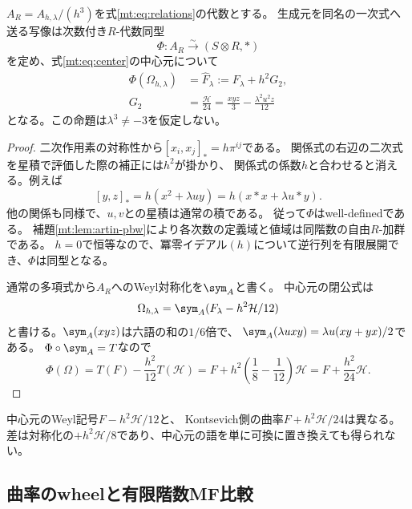 \begin{proposition}[周囲の代数と中心元の二次同定]
\label{kj:prop:algebra-and-center}
$A_R=A_{h,\lambda}/(h^3)$を式\eqref{mt:eq:relations}の代数とする。
生成元を同名の一次式へ送る写像は次数付き$R$-代数同型
\begin{equation}\label{kj:eq:Phi}
 \Phi:A_R\xrightarrow{\sim}(S\otimes R,*)
\end{equation}
を定め、式\eqref{mt:eq:center}の中心元について
\begin{equation}\label{kj:eq:effective}
 \begin{split}
 \Phi(\Omega_{h,\lambda})&=\widehat F_\lambda:=F_\lambda+h^2G_2,\\
 G_2&=\frac{\mathcal H}{24}
     =\frac{xyz}{3}-\frac{\lambda^2u^2z}{12}
 \end{split}
\end{equation}
となる。この命題は$\lambda^3\ne-3$を仮定しない。
\end{proposition}
\begin{proof}
二次作用素の対称性から$[x_i,x_j]_* =h\pi^{ij}$である。
関係式の右辺の二次式を星積で評価した際の補正には$h^2$が掛かり、
関係式の係数$h$と合わせると消える。例えば
\[
 [y,z]_* =h(x^2+\lambda uy)=h(x*x+\lambda u*y).
\]
他の関係も同様で、$u,v$との星積は通常の積である。
従って$\Phi$はwell-definedである。
補題\ref{mt:lem:artin-pbw}により各次数の定義域と値域は同階数の自由$R$-加群である。
$h=0$で恒等なので、冪零イデアル$(h)$について逆行列を有限展開でき、$\Phi$は同型となる。

通常の多項式から$A_R$へのWeyl対称化を$\sym_A$と書く。
中心元の閉公式は
\begin{equation}\label{kj:eq:omega-weyl}
 \Omega_{h,\lambda}=\sym_A(F_\lambda-h^2\mathcal H/12)
\end{equation}
と書ける。$\sym_A(xyz)$は六語の和の$1/6$倍で、
$\sym_A(\lambda uxy)=\lambda u(xy+yx)/2$である。
$\Phi\circ\sym_A=T$なので
\[
 \Phi(\Omega)=T(F)-\frac{h^2}{12}T(\mathcal H)
 =F+h^2\left(\frac18-\frac1{12}\right)\mathcal H
 =F+\frac{h^2}{24}\mathcal H .
\]
\end{proof}

中心元のWeyl記号$F-h^2\mathcal H/12$と、
Kontsevich側の曲率$F+h^2\mathcal H/24$は異なる。
差は対称化の$+h^2\mathcal H/8$であり、中心元の語を単に可換に置き換えても得られない。

\subsection{曲率のwheelと有限階数MF比較}

